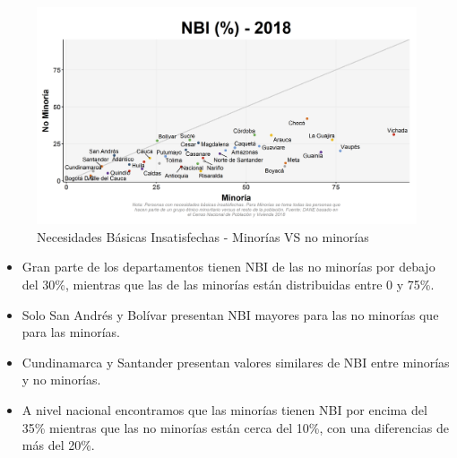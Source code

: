     \begin{figure}[H]
        \caption{Necesidades Básicas Insatisfechas - Minorías VS no minorías \label{map_result_2} }
        \begin{center}
        \includegraphics[width=\textwidth,keepaspectratio]{img/var_272_scatter.png}
        \end{center}
    \end{figure}
            \begin{itemize}
                    \item Gran parte de los departamentos tienen NBI de las no minorías por debajo del 30\%, mientras que las de las minorías están distribuidas entre 0 y 75\%. 
                    \item Solo San Andrés y Bolívar presentan NBI mayores para las no minorías que para las minorías.
                    \item Cundinamarca y Santander presentan valores similares de NBI entre minorías y no minorías.
                    \item A nivel nacional encontramos que las minorías tienen NBI por encima del 35\% mientras que las no minorías están cerca del 10\%, con una diferencias de más del 20\%.
                    \end{itemize}

